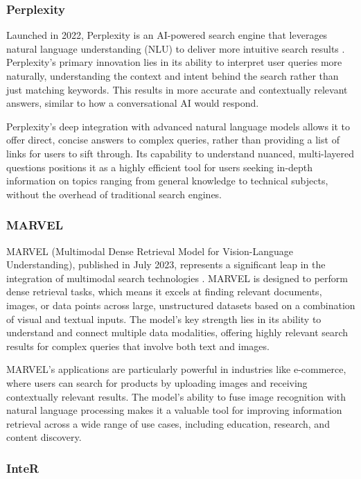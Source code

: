 \subsubsection{Perplexity}

Launched in 2022, Perplexity is an AI-powered search engine that leverages natural language understanding (NLU) to deliver more intuitive search results \cite{Perplexity}. 
Perplexity's primary innovation lies in its ability to interpret user queries more naturally, understanding the context and intent behind the search rather than just matching keywords. 
This results in more accurate and contextually relevant answers, similar to how a conversational AI would respond.

Perplexity's deep integration with advanced natural language models allows it to offer direct, concise answers to complex queries, rather than providing a list of links for users to sift through. 
Its capability to understand nuanced, multi-layered questions positions it as a highly efficient tool for users seeking in-depth information on topics ranging from general knowledge to technical subjects, without the overhead of traditional search engines.

\subsubsection{MARVEL}

MARVEL (Multimodal Dense Retrieval Model for Vision-Language Understanding), published in July 2023, represents a significant leap in the integration of multimodal search technologies \cite{MARVEL}. 
MARVEL is designed to perform dense retrieval tasks, which means it excels at finding relevant documents, images, or data points across large, unstructured datasets based on a combination of visual and textual inputs. 
The model's key strength lies in its ability to understand and connect multiple data modalities, offering highly relevant search results for complex queries that involve both text and images.

MARVEL's applications are particularly powerful in industries like e-commerce, where users can search for products by uploading images and receiving contextually relevant results. 
The model's ability to fuse image recognition with natural language processing makes it a valuable tool for improving information retrieval across a wide range of use cases, including education, research, and content discovery.

\subsubsection{InteR}

